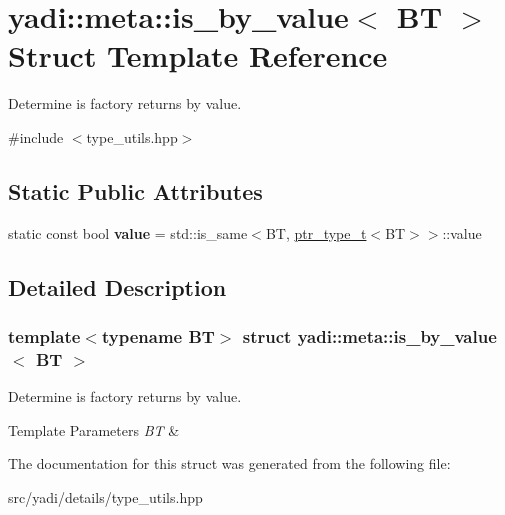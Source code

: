 \hypertarget{structyadi_1_1meta_1_1is__by__value}{}\section{yadi\+:\+:meta\+:\+:is\+\_\+by\+\_\+value$<$ BT $>$ Struct Template Reference}
\label{structyadi_1_1meta_1_1is__by__value}


Determine is factory returns by value.  




{\ttfamily \#include $<$type\+\_\+utils.\+hpp$>$}

\subsection*{Static Public Attributes}
\begin{DoxyCompactItemize}
\item 
\mbox{\label{structyadi_1_1meta_1_1is__by__value_a430929d9f810b08e62a35550240aa925}} 
static const bool {\bfseries value} = std\+::is\+\_\+same$<$BT, \hyperlink{namespaceyadi_a92290eb27cd90666aa87b17d854af9fe}{ptr\+\_\+type\+\_\+t}$<$BT$>$$>$\+::value
\end{DoxyCompactItemize}


\subsection{Detailed Description}
\subsubsection*{template$<$typename BT$>$\newline
struct yadi\+::meta\+::is\+\_\+by\+\_\+value$<$ B\+T $>$}

Determine is factory returns by value. 


\begin{DoxyTemplParams}{Template Parameters}
{\em BT} & \\
\hline
\end{DoxyTemplParams}


The documentation for this struct was generated from the following file\+:\begin{DoxyCompactItemize}
\item 
src/yadi/details/type\+\_\+utils.\+hpp\end{DoxyCompactItemize}
